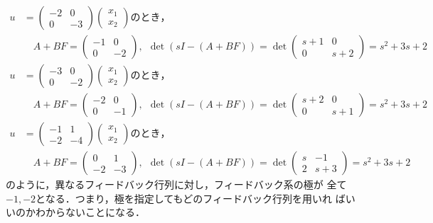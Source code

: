 \begin{align*}
 u &=
 \left(
 \begin{array}{cc}
  -2 & 0 \\
  0 & -3
 \end{array}
 \right)
 \left(
 \begin{array}{c}
  x_1 \\
  x_2
 \end{array}
 \right)のとき，\\
 & \quad
 A+BF = 
 \left(
 \begin{array}{cc}
  -1 & 0 \\
  0 & -2
 \end{array}
 \right), \ \ 
 \det(sI - (A + BF)) =
 \det\left(
 \begin{array}{cc}
  s+1 & 0 \\
  0 & s+2
 \end{array}
 \right)
 = s^2 + 3s + 2 \\[5mm]
 u &=
 \left(
 \begin{array}{cc}
  -3 & 0 \\
  0 & -2
 \end{array}
 \right)
 \left(
 \begin{array}{c}
  x_1 \\
  x_2
 \end{array}
 \right)のとき，\\
 & \quad
 A+BF = 
 \left(
 \begin{array}{cc}
  -2 & 0 \\
  0 & -1
 \end{array}
 \right), \ \ 
 \det(sI - (A + BF)) =
 \det\left(
 \begin{array}{cc}
  s+2 & 0 \\
  0 & s+1
 \end{array}
 \right)
 = s^2 + 3s + 2 \\[5mm]
 u &=
 \left(
 \begin{array}{cc}
  -1 & 1 \\
  -2 & -4
 \end{array}
 \right)
 \left(
 \begin{array}{c}
  x_1 \\
  x_2
 \end{array}
 \right)のとき，\\
 & \quad
 A+BF = 
 \left(
 \begin{array}{cc}
  0 & 1 \\
  -2 & -3
 \end{array}
 \right), \ \ 
 \det(sI - (A + BF)) =
 \det\left(
 \begin{array}{cc}
  s & -1 \\
  2 & s+3
 \end{array}
 \right)
 = s^2 + 3s + 2
\end{align*}
のように，異なるフィードバック行列に対し，フィードバック系の極が
全て$-1, -2$となる．つまり，極を指定してもどのフィードバック行列を用いれ
ばいいのかわからないことになる．

